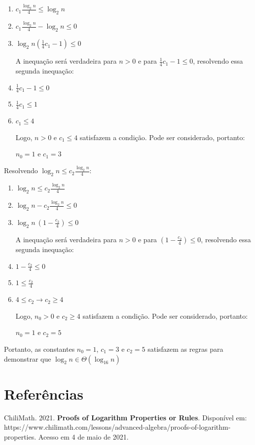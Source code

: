 \documentclass[ a4paper, twocolumn]{article}
\theoremstyle{definition}
\begin{document}
\begin{enumerate}[Step 1:]
	\item   $c_1 \frac{\log_{2}n}{4} \leq \log_2n$
	\item   $c_1 \frac{\log_{2}n}{4} - \log_2n \leq 0$
	\item   $\log_{2}n (\frac{1}{4}c_1 - 1) \leq 0$
	
	A inequação será verdadeira para $n > 0$ e para $\frac{1}{4}c_1 - 1 \leq 0$, resolvendo essa segunda inequação:
	
	\item $\frac{1}{4}c_1 - 1 \leq 0$
	\item $\frac{1}{4}c_1 \leq 1$
	\item $c_1 \leq 4$
	
	Logo, $n > 0$ e $c_1 \leq 4$ satisfazem a condição. Pode ser considerado, portanto:
	
	$n_0 = 1$ e $c_1 = 3$
\end{enumerate}

Resolvendo $\log_2n \leq c_2\frac{\log_{2}n}{4}$:
\begin{enumerate}[Step 1:]
	\item   $\log_2n \leq c_2\frac{\log_{2}n}{4}$
	\item   $\log_2n - c_2\frac{\log_{2}n}{4} \leq 0$
	\item   $\log_2n \ (1 - \frac{c_2}{4}) \leq 0$
	
	A inequação será verdadeira para $n > 0$ e para $(1 - \frac{c_2}{4}) \leq 0$, resolvendo essa segunda inequação:
	
	\item $1 - \frac{c_2}{4} \leq 0$
	\item $1 \leq \frac{c_2}{4}$
	\item $4 \leq c_2 \rightarrow c_2 \geq 4$
	
	Logo, $n_0 > 0$ e $c_2 \geq 4$ satisfazem a condição. Pode ser considerado, portanto:
	
	$n_0 = 1$ e $c_2 = 5$
\end{enumerate}

Portanto, as constantes $n_0 = 1$, $c_1 = 3$ e $c_2 = 5$ satisfazem as regras para demonstrar que $\log_2n \in \Theta(\log_{16}n)$

\section{Referências}
ChiliMath. 2021. \textbf{Proofs of Logarithm Properties or Rules}. Disponível em:  https://www.chilimath.com/lessons/advanced-algebra/proofs-of-logarithm-properties. Acesso em 4 de maio de 2021.
\end{document}

